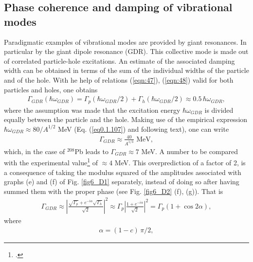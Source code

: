 \subsection{Phase coherence and damping of vibrational modes}\label{S5.5.1} 
Paradigmatic examples of vibrational modes are provided by giant resonances. In particular by the giant dipole resonance (GDR). This collective mode is made out of correlated particle-hole excitations. An estimate of the associated damping width can be obtained in terms of the sum of the individual widths of the particle and of the hole. With he help of  relations (\ref{eqn:47}), (\ref{eqn:48}) valid for both particles and holes, one obtains
\begin{align}\label{eq5.5.1}
\Gamma_{GDR}(\hbar\omega_{GDR})=\Gamma_p(\hbar\omega_{GDR}/2)+\Gamma_h(\hbar\omega_{GDR}/2)\approx0.5\,\hbar\omega_{GDR},
\end{align}
where the assumption was made that the excitation energy $\hbar\omega_{GDR}$ is divided equally between the particle and the hole. Making use of the empirical expression $\hbar\omega_{GDR}\approx80/A^{1/2}$ MeV (Eq. (\ref{eq0.1.107}) and following text), one can write
\begin{align}\label{eq5.5.2}
\Gamma_{GDR}\approx\frac{40}{A^{1/3}}\text{ MeV},
\end{align}
which, in the case of $^{208}$Pb leads to $\Gamma_{GDR}\approx7$ MeV. A number to be compared with the experimental value\footnote{\cite{Bertrand:81}.} of $\approx4$ MeV. This overprediction of a factor of 2, is a consequence of taking the modulus squared of the amplitudes associated with graphs (e) and (f) of Fig. \ref{fig6_D1} separately, instead of doing so after having summed them with the proper phase (see Fig. \ref{fig6_D2} (f), (g)). That is
\begin{align}\label{eq5.5.3}
\Gamma_{GDR}\approx\left|\frac{\sqrt{\Gamma_p}+e^{-i\alpha}\sqrt{\Gamma_h}}{\sqrt{2}}\right|^2\approx\Gamma_p\left|\frac{1+e^{-i\alpha}}{\sqrt{2}}\right|^2=\Gamma_p\left(1+\cos2\alpha\right),
\end{align}
where 
\begin{align}\label{eq5.5.4}
\alpha=(1-c)\,\pi/2,
\end{align}

